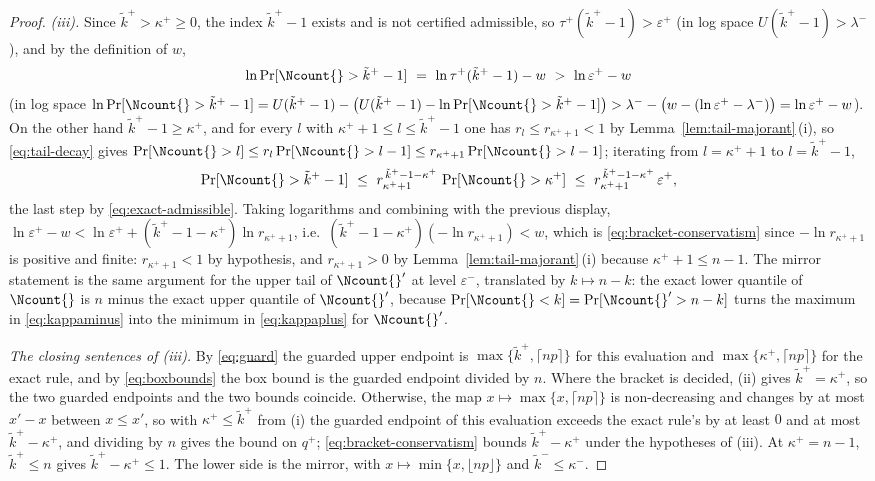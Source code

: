 \begin{proof}
\emph{(iii).} Since $\tilde k^{+}>\kappa^{+}\ge0$, the index $\tilde k^{+}-1$
exists and is not certified admissible, so
$\tau^{+}(\tilde k^{+}-1)>\varepsilon^{+}$ (in log space
$U(\tilde k^{+}-1)>\lambda^{-}$), and by the definition of $w$,
\begin{equation*}
  \ln\Pr[\Ncount{}>\tilde k^{+}-1]\ =\ \ln\tau^{+}(\tilde k^{+}-1)-w
  \ >\ \ln\varepsilon^{+}-w
\end{equation*}
(in log space $\ln\Pr[\Ncount{}>\tilde k^{+}-1]=U(\tilde k^{+}-1)
-\big(U(\tilde k^{+}-1)-\ln\Pr[\Ncount{}>\tilde k^{+}-1]\big)
>\lambda^{-}-\big(w-(\ln\varepsilon^{+}-\lambda^{-})\big)
=\ln\varepsilon^{+}-w$). On the other hand $\tilde k^{+}-1\ge\kappa^{+}$,
and for every $l$ with $\kappa^{+}+1\le l\le\tilde k^{+}-1$ one has
$r_l\le r_{\kappa^{+}+1}<1$ by Lemma~\ref{lem:tail-majorant}\,(i), so
\eqref{eq:tail-decay} gives $\Pr[\Ncount{}>l]\le r_l\Pr[\Ncount{}>l-1]
\le r_{\kappa^{+}+1}\Pr[\Ncount{}>l-1]$; iterating from $l=\kappa^{+}+1$ to
$l=\tilde k^{+}-1$,
\begin{equation*}
  \Pr[\Ncount{}>\tilde k^{+}-1]\ \le\
  r_{\kappa^{+}+1}^{\,\tilde k^{+}-1-\kappa^{+}}\,\Pr[\Ncount{}>\kappa^{+}]
  \ \le\ r_{\kappa^{+}+1}^{\,\tilde k^{+}-1-\kappa^{+}}\,\varepsilon^{+},
\end{equation*}
the last step by \eqref{eq:exact-admissible}. Taking logarithms and
combining with the previous display,
$\ln\varepsilon^{+}-w<\ln\varepsilon^{+}+(\tilde k^{+}-1-\kappa^{+})
\ln r_{\kappa^{+}+1}$, i.e.\
$(\tilde k^{+}-1-\kappa^{+})(-\ln r_{\kappa^{+}+1})<w$, which is
\eqref{eq:bracket-conservatism} since $-\ln r_{\kappa^{+}+1}$ is positive and
finite: $r_{\kappa^{+}+1}<1$ by hypothesis, and $r_{\kappa^{+}+1}>0$ by
Lemma~\ref{lem:tail-majorant}\,(i) because $\kappa^{+}+1\le n-1$. The mirror
statement is the same argument for the upper tail of $\Ncount{}'$ at level
$\varepsilon^{-}$, translated by $k\mapsto n-k$: the exact lower quantile of
$\Ncount{}$ is $n$ minus the exact upper quantile of $\Ncount{}'$, because
$\Pr[\Ncount{}<k]=\Pr[\Ncount{}'>n-k]$ turns the maximum in
\eqref{eq:kappaminus} into the minimum in \eqref{eq:kappaplus} for
$\Ncount{}'$.

\emph{The closing sentences of (iii).} By \eqref{eq:guard} the guarded upper
endpoint is $\max\{\tilde k^{+},\lceil np\rceil\}$ for this evaluation and
$\max\{\kappa^{+},\lceil np\rceil\}$ for the exact rule, and by
\eqref{eq:boxbounds} the box bound is the guarded endpoint divided by $n$.
Where the bracket is decided, (ii) gives $\tilde k^{+}=\kappa^{+}$, so the two
guarded endpoints and the two bounds coincide. Otherwise, the map
$x\mapsto\max\{x,\lceil np\rceil\}$ is non-decreasing and changes by at most
$x'-x$ between $x\le x'$, so with $\kappa^{+}\le\tilde k^{+}$ from (i) the
guarded endpoint of this evaluation exceeds the exact rule's by at least $0$
and at most $\tilde k^{+}-\kappa^{+}$, and dividing by $n$ gives the bound on
$q^{+}$; \eqref{eq:bracket-conservatism} bounds $\tilde k^{+}-\kappa^{+}$
under the hypotheses of (iii). At $\kappa^{+}=n-1$, $\tilde k^{+}\le n$ gives
$\tilde k^{+}-\kappa^{+}\le1$. The lower side is the mirror, with
$x\mapsto\min\{x,\lfloor np\rfloor\}$ and $\tilde k^{-}\le\kappa^{-}$.
\end{proof}
